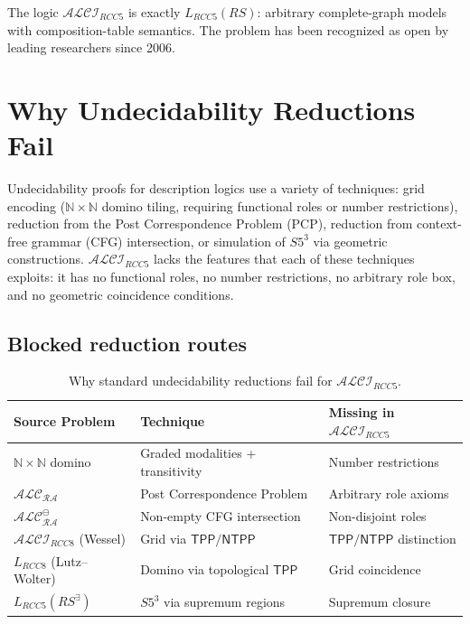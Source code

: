 \documentclass[
]{ceurart}
\theoremstyle{definition}
\newcommand{\ALC}{\ensuremath{\mathcal{ALC}}}
\newcommand{\ALCIRCC}[1]{\ensuremath{\mathcal{ALCI}_{\mathit{RCC#1}}}}
\newcommand{\LRCC}[1]{\ensuremath{L_{\mathit{RCC#1}}}}
\newcommand{\TPP}{\ensuremath{\mathsf{TPP}}}
\newcommand{\NTPP}{\ensuremath{\mathsf{NTPP}}}
\newcommand{\naturals}{\mathbb{N}}
\begin{document}
The logic $\ALCIRCC{5}$ is exactly $\LRCC{5}(\mathit{RS})$:
arbitrary complete-graph models with composition-table semantics.
The problem has been recognized as open by leading researchers
since 2006.

\section{Why Undecidability Reductions Fail}
\label{sec:undecidability}

Undecidability proofs for description logics use a variety of
techniques: grid encoding ($\naturals \times \naturals$ domino
tiling, requiring functional roles or number restrictions),
reduction from the Post Correspondence Problem (PCP), reduction
from context-free grammar (CFG) intersection, or simulation of
$S5^3$ via geometric constructions.
$\ALCIRCC{5}$ lacks the features that each of these techniques
exploits: it has no functional roles, no number restrictions,
no arbitrary role box, and no geometric coincidence conditions.

\subsection{Blocked reduction routes}

\begin{table}[t]
\caption{Why standard undecidability reductions fail for $\ALCIRCC{5}$.}
\label{tab:blocked}
\begin{tabular}{p{3.0cm}p{3.8cm}p{3.5cm}}
\toprule
\textbf{Source Problem} & \textbf{Technique} & \textbf{Missing in $\ALCIRCC{5}$} \\
\midrule
$\naturals \times \naturals$ domino & Graded modalities + transitivity & Number restrictions \\
$\ALC_{\mathcal{RA}}$ \cite{Wessel2001RA} & Post Correspondence Problem & Arbitrary role axioms \\
$\ALC_{\mathcal{RA}}^\ominus$ \cite{Wessel2000RA} & Non-empty CFG intersection & Non-disjoint roles \\
$\ALCIRCC{8}$ (Wessel) & Grid via $\TPP/\NTPP$ & $\TPP/\NTPP$ distinction \\
$\LRCC{8}$ (Lutz--Wolter) & Domino via topological $\TPP$ & Grid coincidence \\
$\LRCC{5}(\mathit{RS}^\exists)$ & $S5^3$ via supremum regions & Supremum closure \\
\bottomrule
\end{tabular}
\end{table}
\end{document}
